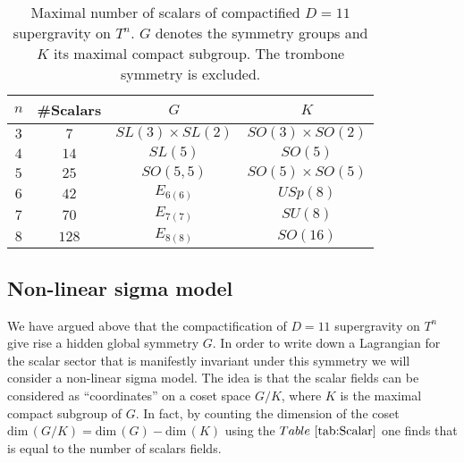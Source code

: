 \begin{table}[]
    \centering
    \caption{Maximal number of scalars of compactified $D=11$ supergravity on $T^n$. $G$ denotes the symmetry groups and $K$ its maximal compact subgroup. The trombone symmetry is excluded.}
    \label{tab:Scalar}
    \begin{tabular}{|c|c|c|c|}\hline
         $n$ & \#Scalars & $G$ & $K$ \\\hline
         $3$ & $7$ & $SL(3)\times SL(2)$ & $SO(3)\times SO(2)$\\\hline
         $4$ & $14$ & $SL(5)$ & $SO(5)$ \\\hline
         $5$ & $25$ & $SO(5,5)$ & $SO(5)\times SO(5)$ \\\hline
         $6$ & $42$ & $E_{6(6)}$ & $USp(8)$ \\\hline
         $7$ & $70$ & $E_{7(7)}$ & $SU(8)$ \\\hline
         $8$ & $128$ & $E_{8(8)}$ & $SO(16)$ \\\hline
    \end{tabular}
\end{table}

\subsection{Non-linear sigma model\label{sec:NonLinearSigmaModels}}
We have argued above that the compactification of $D=11$ supergravity on $T^n$ give rise a hidden global symmetry $G$. In order to write down a Lagrangian for the scalar sector that is manifestly invariant under this symmetry we will consider a non-linear sigma model. The idea is that the scalar fields can be considered as ``coordinates'' on a coset space $G/K$, where $K$ is the maximal compact subgroup of $G$. In fact, by counting the dimension of the coset $\text{dim}\,(G/K)=\text{dim}\,(G)-\text{dim}\,(K)$ using the $\tabref{tab:Scalar}$ one finds that is equal to the number of scalars fields. 

